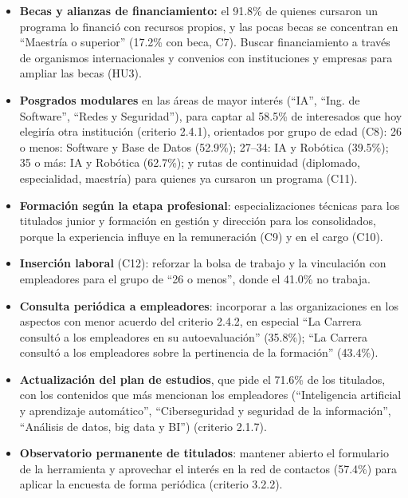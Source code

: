 \begin{itemize}
  \item \textbf{Becas y alianzas de financiamiento:} el 91.8\% de quienes cursaron un programa lo financió con recursos propios, y las pocas becas se concentran en ``Maestría o superior'' (17.2\% con beca, C7). Buscar financiamiento a través de organismos internacionales y convenios con instituciones y empresas para ampliar las becas (HU3).
  \item \textbf{Posgrados modulares} en las áreas de mayor interés (``IA'', ``Ing. de Software'', ``Redes y Seguridad''), para captar al 58.5\% de interesados que hoy elegiría otra institución (criterio 2.4.1), orientados por grupo de edad (C8): 26 o menos: Software y Base de Datos (52.9\%); 27–34: IA y Robótica (39.5\%); 35 o más: IA y Robótica (62.7\%); y rutas de continuidad (diplomado, especialidad, maestría) para quienes ya cursaron un programa (C11).
  \item \textbf{Formación según la etapa profesional}: especializaciones técnicas para los titulados junior y formación en gestión y dirección para los consolidados, porque la experiencia influye en la remuneración (C9) y en el cargo (C10).
  \item \textbf{Inserción laboral} (C12): reforzar la bolsa de trabajo y la vinculación con empleadores para el grupo de ``26 o menos'', donde el 41.0\% no trabaja.
  \item \textbf{Consulta periódica a empleadores}: incorporar a las organizaciones en los aspectos con menor acuerdo del criterio 2.4.2, en especial ``La Carrera consultó a los empleadores en su autoevaluación'' (35.8\%); ``La Carrera consultó a los empleadores sobre la pertinencia de la formación'' (43.4\%).
  \item \textbf{Actualización del plan de estudios}, que pide el 71.6\% de los titulados, con los contenidos que más mencionan los empleadores (``Inteligencia artificial y aprendizaje automático'', ``Ciberseguridad y seguridad de la información'', ``Análisis de datos, big data y BI'') (criterio 2.1.7).
  \item \textbf{Observatorio permanente de titulados}: mantener abierto el formulario de la herramienta y aprovechar el interés en la red de contactos (57.4\%) para aplicar la encuesta de forma periódica (criterio 3.2.2).
\end{itemize}
